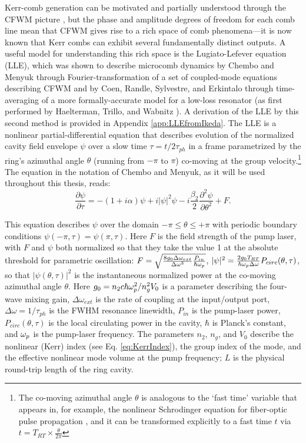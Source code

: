 Kerr-comb generation can be motivated and partially understood through the CFWM picture \cite{Herr2012}, but the phase and amplitude degrees of freedom for each comb line mean that CFWM gives rise to a rich space of comb phenomena---it is now known that Kerr combs can exhibit several fundamentally distinct outputs.  A useful model for understanding this rich space is the Lugiato-Lefever equation (LLE), which was shown to describe microcomb dynamics by Chembo and Menyuk \cite{Chembo2013} through Fourier-transformation of a set of coupled-mode equations describing CFWM and by Coen, Randle, Sylvestre, and Erkintalo \cite{Coen2013a} through time-averaging of a more formally-accurate model for a low-loss resonator (as first performed by Haelterman, Trillo, and Wabnitz \cite{Haelterman1992a}). A derivation of the LLE by this second method is provided in Appendix \ref{app:LLEfromIkeda}. The LLE is a nonlinear partial-differential equation that describes evolution of the normalized cavity field envelope $\psi$ over a slow time $\tau=t/2\tau_{ph}$ in a frame parametrized by the ring's azimuthal angle $\theta$ (running from $-\pi$ to $\pi$) co-moving at the group velocity.\footnote{The co-moving azimuthal angle $\theta$ is analogous to the `fast time' variable that appears in, for example, the nonlinear Schrodinger equation for fiber-optic pulse propagation \cite{Agrawal2007}, and it can be transformed explicitly to a fast time $t$ via $t=T_{RT}\times\frac{\theta}{2\pi}$} The equation in the notation of Chembo and Menyuk, as it will be used throughout this thesis, reads:
\begin{equation}
\frac{\partial \psi}{\partial \tau}=-(1+i \alpha) \psi + i|\psi|^2 \psi -i \frac{\beta_2}{2} \frac{\partial^2 \psi}{\partial \theta^2} +F. \label{eq:LLE}
\end{equation}

This equation describes $\psi$ over the domain $-\pi\leq\theta\leq+\pi$ with periodic boundary conditions $\psi(-\pi,\tau)=\psi(\pi,\tau)$. Here $F$ is the field strength of the pump laser, with $F$ and $\psi$ both normalized so that they  take the value 1 at the absolute threshold for parametric oscillation: $F=\sqrt{\frac{8 g_0\Delta\omega_{ext}}{\Delta\omega^3}\frac{P_{in}}{\hbar \omega_{p}}}$, $|\psi|^2=\frac{2g_0T_{RT}}{\hbar\omega_{p}\Delta\omega}P_{circ}(\theta,\tau)$, so that $|\psi(\theta,\tau)|^2$ is the instantaneous normalized power at the co-moving azimuthal angle $\theta$. Here $g_0=n_2 c \hbar \omega_{p}^2/n_g^2 V_0$ is a parameter describing the four-wave mixing gain, $\Delta\omega_{ext}$ is the rate of coupling at the input/output port, $\Delta\omega=1/\tau_{ph}$ is the FWHM resonance linewidth, $P_{in}$ is the pump-laser power, $P_{circ}(\theta,\tau)$ is the local circulating power in the cavity, $\hbar$ is Planck's constant, and $\omega_{p}$ is the pump-laser frequency. The parameters $n_2$, $n_g$, and $V_0$ describe the nonlinear (Kerr) index (see Eq. \ref{eq:KerrIndex}), the group index of the mode, and the effective nonlinear mode volume at the pump frequency; $L$ is the physical round-trip length of the ring cavity. 

